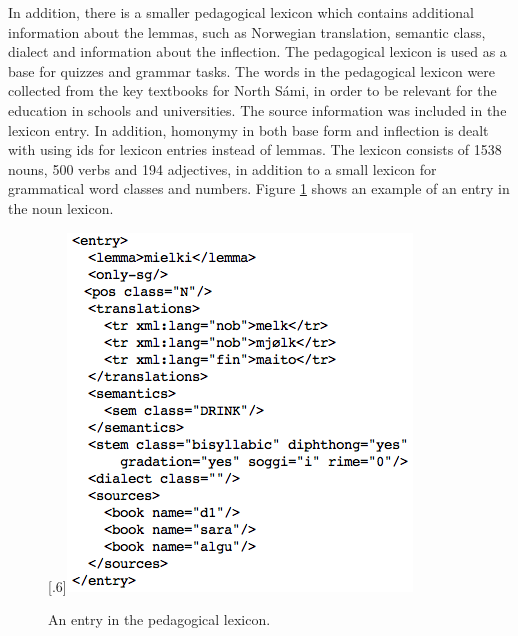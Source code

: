 \documentclass[11pt]{article}
\begin{document}


In addition, there is a smaller pedagogical lexicon which contains additional information about the lemmas, such as Norwegian translation, semantic class, dialect and information about the inflection. The pedagogical lexicon is used as a base for quizzes and grammar tasks. The words in the pedagogical lexicon were collected from the key textbooks for North Sámi, in order to be relevant for the education in schools and universities. The source information was included in the lexicon entry. %
In addition, homonymy in both base form and inflection is dealt with using ids for lexicon entries instead of lemmas. 
The lexicon consists of 1538 nouns, 500 verbs and 194 adjectives, in addition to a small lexicon for grammatical word classes and numbers. Figure \ref{nounlex} shows an example of an entry in the noun lexicon. \\

\begin{figure}[tbp]
\begin{center}
\scalebox{.6}[.6]{\includegraphics{presentation/img/nounlexicon3.png}}\\
\caption{An entry in the pedagogical lexicon.}
\label{nounlex}
\end{center}
\end{figure}
\end{document}
